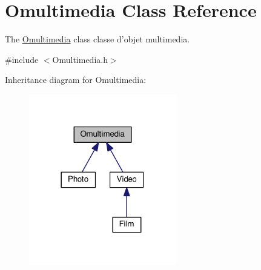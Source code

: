 \hypertarget{class_omultimedia}{\section{Omultimedia Class Reference}
\label{class_omultimedia}
}


The \hyperlink{class_omultimedia}{Omultimedia} class classe d'objet multimedia.  




{\ttfamily \#include $<$Omultimedia.\+h$>$}



Inheritance diagram for Omultimedia\+:
\nopagebreak
\begin{figure}[H]
\begin{center}
\leavevmode
\includegraphics[width=182pt]{class_omultimedia__inherit__graph}
\end{center}
\end{figure}
